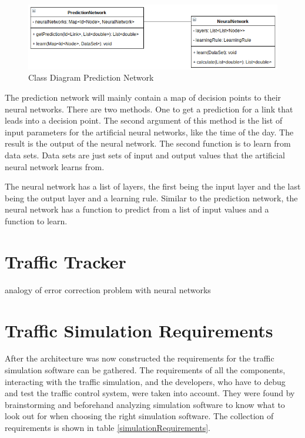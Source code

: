 \begin{figure}[!ht]
  \centering
  \includegraphics[width=16cm]{figures/predictionNetwork}
  \caption[Class Diagram Prediction Network]{Class Diagram Prediction Network \protect\footnotemark}
  \label{predictionNetwork}
\end{figure}


The prediction network will mainly contain a map of decision points to their neural networks. There are two methods. One to get a prediction for a link that leads into a decision point. The second argument of this method is the list of input parameters for the artificial neural networks, like the time of the day. The result is the output of the neural network. The second function is to learn from data sets. Data sets are just sets of input and output values that the artificial neural network learns from.

The neural network has a list of layers, the first being the input layer and the last being the output layer and a learning rule. Similar to the prediction network, the neural network has a function to predict from a list of input values and a function to learn.

\section{Traffic Tracker}
\label{trafficTracker}

analogy of error correction problem with neural networks

\section{Traffic Simulation Requirements}
\label{trafficSimulationRequirements}

After the architecture was now constructed the requirements for the traffic simulation software can be gathered. The requirements of all the components, interacting with the traffic simulation, and the developers, who have to debug and test the traffic control system, were taken into account. They were found by brainstorming and beforehand analyzing simulation software to know what to look out for when choosing the right simulation software. The collection of requirements is shown in table \ref{simulationRequirements}.

